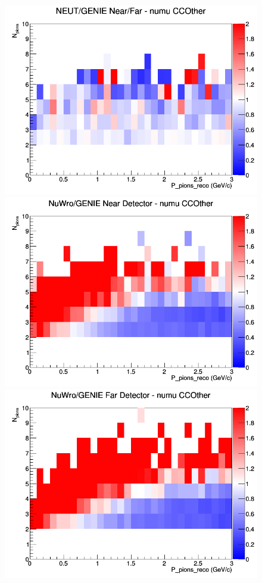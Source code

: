 \documentclass[12pt]{article}
\begin{document}
\begin{figure}[h]
\endminipage
{}
\includegraphics[width=\linewidth]{eff_N_P/LAr/pions/ratios/CCOther_NEUT_GENIE_numu_NF_N_P.png}
\endminipage
\newline
{}
\includegraphics[width=\linewidth]{eff_N_P/LAr/pions/ratios/CCOther_NuWro_GENIE_numu_near_N_P.png}
\endminipage
{}
\includegraphics[width=\linewidth]{eff_N_P/LAr/pions/ratios/CCOther_NuWro_GENIE_numu_far_N_P.png}

\end{figure}
\end{document}
